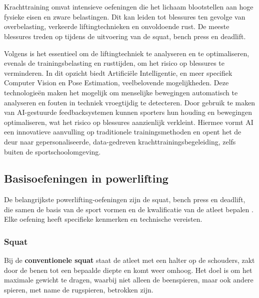 \chapter{}%
\label{ch:stand-van-zaken}



Krachttraining omvat intensieve oefeningen die het lichaam blootstellen aan hoge fysieke eisen en zware belastingen. 
Dit kan leiden tot blessures ten gevolge van overbelasting, verkeerde liftingtechnieken en onvoldoende rust. 
De meeste blessures treden op tijdens de uitvoering van de squat, bench press en deadlift. 

\medskip

Volgens \textcite{BengtssonEtAl2018} is het essentieel om de liftingtechniek te analyseren en te optimaliseren, evenals de trainingsbelasting en rusttijden, om het risico op blessures te verminderen.
In dit opzicht biedt Artificiële Intelligentie, en meer specifiek Computer Vision en Pose Estimation, veelbelovende mogelijkheden.
Deze technologieën maken het mogelijk om menselijke bewegingen automatisch te analyseren en fouten in techniek vroegtijdig te detecteren. 
Door gebruik te maken van AI-gestuurde feedbacksystemen kunnen sporters hun houding en bewegingen optimaliseren, wat het risico op blessures aanzienlijk verkleint. 
Hiermee vormt AI een innovatieve aanvulling op traditionele trainingsmethoden en opent het de deur naar gepersonaliseerde, data-gedreven krachttrainingsbegeleiding, zelfs buiten de sportschoolomgeving.

\section{Basisoefeningen in powerlifting}
\label{sec:basisoefeningen-in-powerlifting}
De belangrijkste powerlifting-oefeningen zijn de squat, bench press en deadlift, die samen de basis van de sport vormen en de kwalificatie van de atleet bepalen \autocite{TymchikEtAl2021}. 
Elke oefening heeft specifieke kenmerken en technische vereisten.

\subsection{Squat}
\label{subsec:squat}
Bij de \textbf{conventionele squat} staat de atleet met een halter op de schouders, zakt door de benen tot een bepaalde diepte en komt weer omhoog. 
Het doel is om het maximale gewicht te dragen, waarbij niet alleen de beenspieren, maar ook andere spieren, met name de rugspieren, betrokken zijn.

